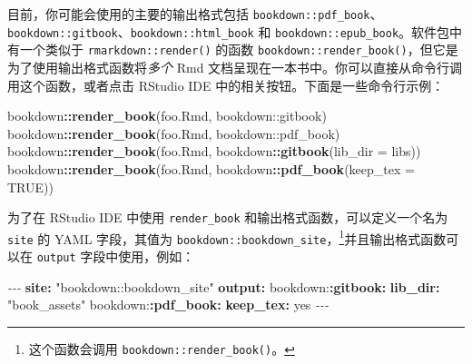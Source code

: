 \documentclass[
  12pt,
]{krantz}
\newenvironment{Shaded}{\begin{snugshade}}{\end{snugshade}}
\newcommand{\AttributeTok}[1]{\textcolor[rgb]{0.13,0.29,0.53}{#1}}
\newcommand{\CharTok}[1]{\textcolor[rgb]{0.31,0.60,0.02}{#1}}
\newcommand{\ConstantTok}[1]{\textcolor[rgb]{0.56,0.35,0.01}{#1}}
\newcommand{\FunctionTok}[1]{\textcolor[rgb]{0.13,0.29,0.53}{\textbf{#1}}}
\newcommand{\KeywordTok}[1]{\textcolor[rgb]{0.13,0.29,0.53}{\textbf{#1}}}
\newcommand{\NormalTok}[1]{#1}
\newcommand{\PreprocessorTok}[1]{\textcolor[rgb]{0.56,0.35,0.01}{\textit{#1}}}
\newcommand{\SpecialCharTok}[1]{\textcolor[rgb]{0.81,0.36,0.00}{\textbf{#1}}}
\newcommand{\StringTok}[1]{\textcolor[rgb]{0.31,0.60,0.02}{#1}}
\theoremstyle{definition}
\theoremstyle{definition}
\theoremstyle{definition}
\theoremstyle{definition}
\theoremstyle{remark}
\begin{document}
目前，你可能会使用的主要的输出格式包括 \texttt{bookdown::pdf\_book}、\texttt{bookdown::gitbook}、\texttt{bookdown::html\_book} 和 \texttt{bookdown::epub\_book}。软件包中有一个类似于 \texttt{rmarkdown::render()} 的函数 \texttt{bookdown::render\_book()}，但它是为了使用输出格式函数将\emph{多个} Rmd 文档呈现在一本书中。你可以直接从命令行调用这个函数，或者点击 RStudio IDE 中的相关按钮。下面是一些命令行示例：

\begin{Shaded}
\begin{Highlighting}[]
\NormalTok{bookdown}\SpecialCharTok{::}\FunctionTok{render\_book}\NormalTok{(}\StringTok{\textquotesingle{}foo.Rmd\textquotesingle{}}\NormalTok{, }\StringTok{\textquotesingle{}bookdown::gitbook\textquotesingle{}}\NormalTok{)}
\NormalTok{bookdown}\SpecialCharTok{::}\FunctionTok{render\_book}\NormalTok{(}\StringTok{\textquotesingle{}foo.Rmd\textquotesingle{}}\NormalTok{, }\StringTok{\textquotesingle{}bookdown::pdf\_book\textquotesingle{}}\NormalTok{)}
\NormalTok{bookdown}\SpecialCharTok{::}\FunctionTok{render\_book}\NormalTok{(}\StringTok{\textquotesingle{}foo.Rmd\textquotesingle{}}\NormalTok{, bookdown}\SpecialCharTok{::}\FunctionTok{gitbook}\NormalTok{(}\AttributeTok{lib\_dir =} \StringTok{\textquotesingle{}libs\textquotesingle{}}\NormalTok{))}
\NormalTok{bookdown}\SpecialCharTok{::}\FunctionTok{render\_book}\NormalTok{(}\StringTok{\textquotesingle{}foo.Rmd\textquotesingle{}}\NormalTok{, bookdown}\SpecialCharTok{::}\FunctionTok{pdf\_book}\NormalTok{(}\AttributeTok{keep\_tex =} \ConstantTok{TRUE}\NormalTok{))}
\end{Highlighting}
\end{Shaded}

为了在 RStudio IDE 中使用 \texttt{render\_book} 和输出格式函数，可以定义一个名为 \texttt{site} 的 YAML 字段，其值为 \texttt{bookdown::bookdown\_site}，\footnote{这个函数会调用 \texttt{bookdown::render\_book()}。}并且输出格式函数可以在 \texttt{output} 字段中使用，例如：

\begin{Shaded}
\begin{Highlighting}[]
\PreprocessorTok{{-}{-}{-}}
\FunctionTok{site}\KeywordTok{:}\AttributeTok{ }\StringTok{"bookdown::bookdown\_site"}
\FunctionTok{output}\KeywordTok{:}
\AttributeTok{  bookdown:}\FunctionTok{:gitbook}\KeywordTok{:}
\AttributeTok{    }\FunctionTok{lib\_dir}\KeywordTok{:}\AttributeTok{ }\StringTok{"book\_assets"}
\AttributeTok{  bookdown:}\FunctionTok{:pdf\_book}\KeywordTok{:}
\AttributeTok{    }\FunctionTok{keep\_tex}\KeywordTok{:}\AttributeTok{ }\CharTok{yes}
\PreprocessorTok{{-}{-}{-}}
\end{Highlighting}
\end{Shaded}
\end{document}
